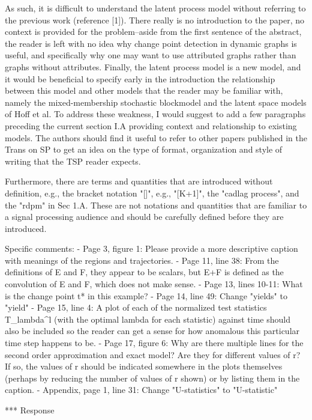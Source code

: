 As such, it is difficult to understand the latent process model
without referring to the previous work (reference [1]). There really
is no introduction to the paper, no context is provided for the
problem--aside from the first sentence of the abstract, the reader is
left with no idea why change point detection in dynamic graphs is
useful, and specifically why one may want to use attributed graphs
rather than graphs without attributes. Finally, the latent process
model is a new model, and it would be beneficial to specify early in
the introduction the relationship between this model and other models
that the reader may be familiar with, namely the mixed-membership
stochastic blockmodel and the latent space models of Hoff et al. To
address these weakness, I would suggest to add a few paragraphs
preceding the current section I.A providing context and relationship
to existing models. The authors should find it useful to refer to
other papers published in the Trans on SP to get an idea on the type
of format, organization and style of writing that the TSP reader
expects.

Furthermore, there are terms and quantities that are introduced
without definition, e.g., the bracket notation "[]", e.g., "[K+1]",
the "cadlag process", and the "rdpm" in Sec 1.A. These are not
notations and quantities that are familiar to a signal processing
audience and should be carefully defined before they are introduced.

Specific comments:
- Page 3, figure 1: Please provide a more descriptive caption with
meanings of the regions and trajectories.
- Page 11, line 38: From the definitions of E and F, they appear to be
scalars, but E+F is defined as the convolution of E and F, which does
not make sense.
- Page 13, lines 10-11: What is the change point t* in this example?
- Page 14, line 49: Change "yields" to "yield"
- Page 15, line 4: A plot of each of the normalized test statistics
T_lambda^l (with the optimal lambda for each statistic) against time
should also be included so the reader can get a sense for how
anomalous this particular time step happens to be.
- Page 17, figure 6: Why are there multiple lines for the second order
approximation and exact model? Are they for different values of r? If
so, the values of r should be indicated somewhere in the plots
themselves (perhaps by reducing the number of values of r shown) or by
listing them in the caption.
- Appendix, page 1, line 31: Change "U-statistics" to "U-statistic"

*** Response

